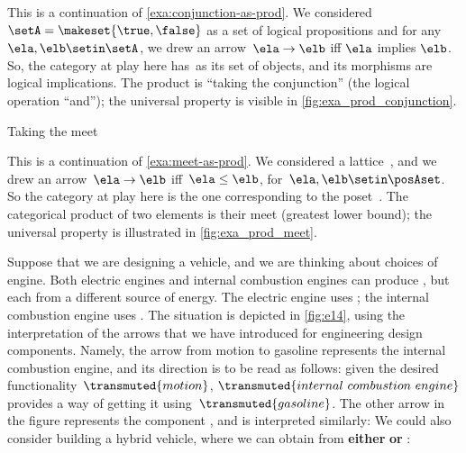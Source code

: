 \begin{example}
    \label{exa:conjunction-as-prod-cont}
    This is a continuation of \cref{exa:conjunction-as-prod}.
    We considered~$\setA = \makeset{ \true, \false }$ as a set of logical propositions and for any~$\ela, \elb  \setin \setA$, we drew an arrow~$\ela \to \elb$ iff $\ela$ implies $\elb$.
    So, the category at play here has~\setA as its set of objects, and its morphisms are logical implications.
    The product is ``taking the conjunction'' (the logical operation ``and''); the universal property is visible in \cref{fig:exa_prod_conjunction}.

\end{example}

\begin{marginfigure}
    \centering
    \caption{Taking the meet}
    \label{fig:exa_prod_meet_cont}
\end{marginfigure}

\begin{example}
    \label{exa:meet-as-prod-cont}
    This is a continuation of \cref{exa:meet-as-prod}.
    We considered a lattice~\posA, and we drew an arrow~$\ela \to \elb$ iff~$\ela \leq \elb$, for~$\ela,\elb\setin \posAset$.
    So the category at play here is the one corresponding to the poset~\posA.
    The categorical product of two elements is their meet (greatest lower bound); the universal property is illustrated in \cref{fig:exa_prod_meet}.
\end{example}

\begin{example}
    Suppose that we are designing a vehicle, and we are thinking about choices of engine.
    Both electric engines and internal combustion engines can produce , but each from a different source of energy.
    The electric engine uses ; the internal combustion engine uses .
    The situation is depicted in \cref{fig:e14}, using the interpretation of the arrows that we have introduced for engineering design components.
    Namely, the arrow from motion to gasoline represents the internal combustion engine, and its direction is to be read as follows: given the desired functionality~$\transmuted{motion}$, $\transmuted{internal \ combustion \ engine}$ provides a way of getting it using~$\transmuted{gasoline}$.
    The other arrow in the figure represents the component , and is interpreted similarly:
    We could also consider building a hybrid vehicle, where we can obtain  from \textbf{either}  \textbf{or} :
\end{example}

